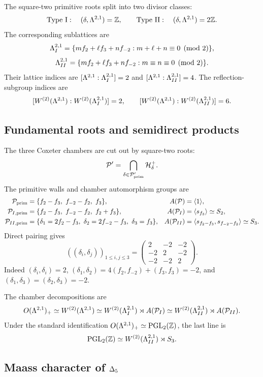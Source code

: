 The square-two primitive roots split into two divisor classes:
\[
  \text{Type I}:\quad (\delta,\Lambda^{2,1})=\mathbb{Z},
  \qquad
  \text{Type II}:\quad (\delta,\Lambda^{2,1})=2\mathbb{Z}.
\]
The corresponding sublattices are
\[
  \Lambda_I^{2,1}
  =\{m f_2+\ell f_3+n f_{-2}:m+\ell+n\equiv0\pmod2\},
\]
\[
  \Lambda_{II}^{2,1}
  =\{m f_2+\ell f_3+n f_{-2}:m\equiv n\equiv0\pmod2\}.
\]
Their lattice indices are
$[\Lambda^{2,1}:\Lambda_I^{2,1}]=2$ and
$[\Lambda^{2,1}:\Lambda_{II}^{2,1}]=4$. The reflection-subgroup indices are
\[
  [W^{(2)}(\Lambda^{2,1}):W^{(2)}(\Lambda_I^{2,1})]=2,
  \qquad
  [W^{(2)}(\Lambda^{2,1}):W^{(2)}(\Lambda_{II}^{2,1})]=6.
\]

\subsection*{Fundamental roots and semidirect products}

The three Coxeter chambers are cut out by square-two roots:
\[
  \mathcal{P}'=\bigcap_{\delta\in\mathcal{P}'_{\mathrm{prim}}}\mathcal{H}^+_\delta.
\]
The primitive walls and chamber automorphism groups are
\begin{align*}
  \mathcal{P}_{\mathrm{prim}}
    &=\{f_2-f_3,\ f_{-2}-f_2,\ f_3\},
  & A(\mathcal{P})&=\langle1\rangle,\\
  \mathcal{P}_{I,\mathrm{prim}}
    &=\{f_2-f_3,\ f_{-2}-f_2,\ f_2+f_3\},
  & A(\mathcal{P}_I)&=\langle s_{f_3}\rangle\simeq S_2,\\
  \mathcal{P}_{II,\mathrm{prim}}
    &=\{\delta_1=2f_2-f_3,\ \delta_2=2f_{-2}-f_3,\ \delta_3=f_3\},
  & A(\mathcal{P}_{II})&=\langle s_{f_2-f_3},s_{f_{-2}-f_2}\rangle\simeq S_3.
\end{align*}
Direct pairing gives
\[
  ((\delta_i,\delta_j))_{1\leq i,j\leq3}
  =
  \begin{pmatrix}
  2&-2&-2\\
  -2&2&-2\\
  -2&-2&2
  \end{pmatrix}.
\]
Indeed $(\delta_i,\delta_i)=2$,
$(\delta_1,\delta_2)=4(f_2,f_{-2})+(f_3,f_3)=-2$, and
$(\delta_1,\delta_3)=(\delta_2,\delta_3)=-2$.

The chamber decompositions are
\[
  O(\Lambda^{2,1})_+
  \simeq W^{(2)}(\Lambda^{2,1})
  \simeq W^{(2)}(\Lambda_I^{2,1})\rtimes A(\mathcal{P}_I)
  \simeq W^{(2)}(\Lambda_{II}^{2,1})\rtimes A(\mathcal{P}_{II}).
\]
Under the standard identification $O(\Lambda^{2,1})_+\simeq
\mathrm{PGL}_2(\mathbb{Z})$, the last line is
\[
  \mathrm{PGL}_2(\mathbb{Z})
  \simeq W^{(2)}(\Lambda_{II}^{2,1})\rtimes S_3 .
\]

\subsection*{Maass character of \texorpdfstring{$\Delta_{5}$}{Delta5}}


